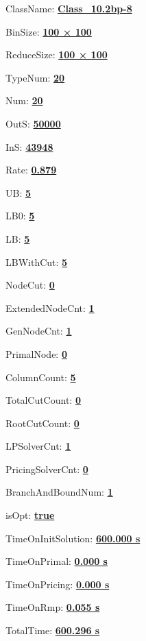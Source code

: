 \documentclass[11pt]{article}
\begin{document}
\pagestyle{empty}


ClassName: \underline{\textbf{Class_10.2bp-8}}
\par
BinSize: \underline{\textbf{100 × 100}}
\par
ReduceSize: \underline{\textbf{100 × 100}}
\par
TypeNum: \underline{\textbf{20}}
\par
Num: \underline{\textbf{20}}
\par
OutS: \underline{\textbf{50000}}
\par
InS: \underline{\textbf{43948}}
\par
Rate: \underline{\textbf{0.879}}
\par
UB: \underline{\textbf{5}}
\par
LB0: \underline{\textbf{5}}
\par
LB: \underline{\textbf{5}}
\par
LBWithCut: \underline{\textbf{5}}
\par
NodeCut: \underline{\textbf{0}}
\par
ExtendedNodeCnt: \underline{\textbf{1}}
\par
GenNodeCnt: \underline{\textbf{1}}
\par
PrimalNode: \underline{\textbf{0}}
\par
ColumnCount: \underline{\textbf{5}}
\par
TotalCutCount: \underline{\textbf{0}}
\par
RootCutCount: \underline{\textbf{0}}
\par
LPSolverCnt: \underline{\textbf{1}}
\par
PricingSolverCnt: \underline{\textbf{0}}
\par
BranchAndBoundNum: \underline{\textbf{1}}
\par
isOpt: \underline{\textbf{true}}
\par
TimeOnInitSolution: \underline{\textbf{600.000 s}}
\par
TimeOnPrimal: \underline{\textbf{0.000 s}}
\par
TimeOnPricing: \underline{\textbf{0.000 s}}
\par
TimeOnRmp: \underline{\textbf{0.055 s}}
\par
TotalTime: \underline{\textbf{600.296 s}}
\par
\newpage


\end{document}
